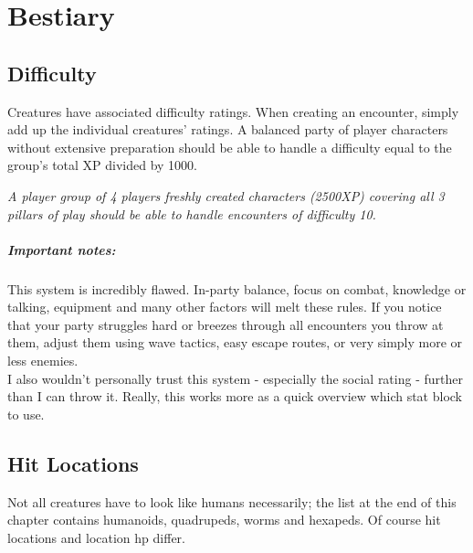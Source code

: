 \documentclass[12pt,a4paper,openany,usenames,dvipsnames]{book}
\begin{document}
	\chapter{Bestiary}
	\section{Difficulty}
	Creatures have associated difficulty ratings. When creating an encounter, simply add up the individual creatures' ratings. A balanced party of player characters without extensive preparation should be able to handle a difficulty equal to the group's total XP divided by 1000.
	\begin{exampleblock}
		\itshape
		A player group of 4 players freshly created characters (2500XP)
			covering all 3 pillars of play
			should be able to handle encounters of difficulty 10.
	\end{exampleblock}
	\paragraph{Important notes:}
	This system is incredibly flawed. In-party balance, focus on combat, knowledge or talking, equipment and many other factors will melt these rules. If you notice that your party struggles hard or breezes through all encounters you throw at them, adjust them using wave tactics, easy escape routes, or very simply more or less enemies.\\
	I also wouldn't personally trust this system - especially the social rating - further than I can throw it. Really, this works more as a quick overview which stat block to use.
	
	\section{Hit Locations}
	Not all creatures have to look like humans necessarily; the list at the end of this chapter contains humanoids, quadrupeds, worms and hexapeds. Of course hit locations and location hp differ.
	
\end{document}
